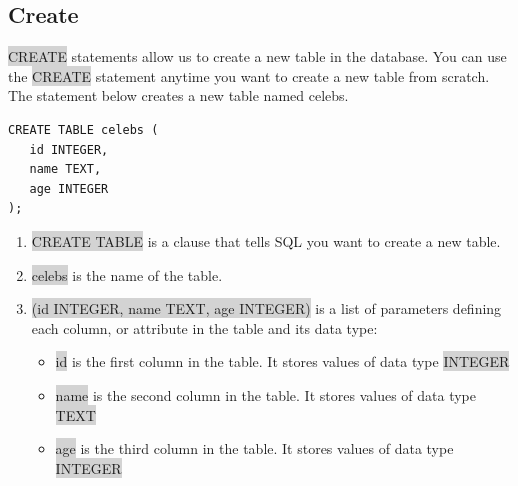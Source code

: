 \documentclass[11pt]{article}
\begin{document}
\subsection{Create}
\colorbox{lightgray}{CREATE} statements allow us to create a new table in the database. You can use the \colorbox{lightgray}{CREATE} statement anytime you want to create a new table from scratch. The statement below creates a new table named celebs.
\begin{lstlisting}
CREATE TABLE celebs (
   id INTEGER, 
   name TEXT, 
   age INTEGER
);
\end{lstlisting}
\begin{enumerate}[leftmargin = *]
\item \colorbox{lightgray}{CREATE TABLE} is a clause that tells SQL you want to create a new table.
\item \colorbox{lightgray}{celebs} is the name of the table.
\item \colorbox{lightgray}{(id INTEGER, name TEXT, age INTEGER)} is a list of parameters defining each column, or attribute in the table and its data type:
\begin{itemize}
\item \colorbox{lightgray}{id} is the first column in the table. It stores values of data type \colorbox{lightgray}{INTEGER}
\item \colorbox{lightgray}{name} is the second column in the table. It stores values of data type \colorbox{lightgray}{TEXT}
\item \colorbox{lightgray}{age} is the third column in the table. It stores values of data type \colorbox{lightgray}{INTEGER}
\end{itemize}
\end{enumerate}
\end{document}

